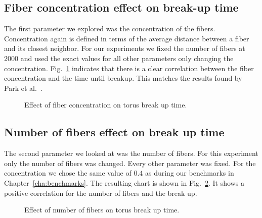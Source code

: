 \subsection{Fiber concentration effect on break-up time}

The first parameter we explored was the concentration of the fibers. Concentration again is defined in terms of the average distance between a fiber and its closest neighbor. For our experiments we fixed the number of fibers at $2000$ and used the exact values for all other parameters only changing the concentration. Fig.~\ref{fig:concentration_breakup} indicates that there is a clear correlation between the fiber concentration and the time until breakup. This matches the results found by Park et al.~\cite{Park2010}.

\begin{figure}[!htbp]
  \centering
  \caption{Effect of fiber concentration on torus break up time.}
  \label{fig:concentration_breakup}
\end{figure}

\subsection{Number of fibers effect on break up time}

The second parameter we looked at was the number of fibers. For this experiment only the number of fibers was changed. Every other parameter was fixed. For the concentration we chose the same value of $0.4$ as during our benchmarks in Chapter~\ref{cha:benchmarks}. The resulting chart is shown in Fig.~\ref{fig:number_breakup}. It shows a positive correlation for the number of fibers and the break up.

\begin{figure}[!htbp]
  \centering
  \caption{Effect of number of fibers on torus break up time.}
  \label{fig:number_breakup}
\end{figure}

